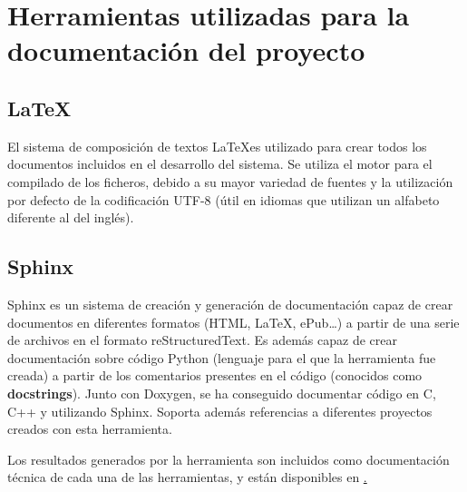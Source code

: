 \section{Herramientas utilizadas para la documentación del proyecto}

\subsection{\LaTeX}

El sistema de composición de textos \LaTeX es utilizado para crear todos los documentos incluidos en el desarrollo del sistema. Se utiliza el motor \XeLaTeX para el compilado de los ficheros, debido a su mayor variedad de fuentes y la utilización por defecto de la codificación UTF-8 (útil en idiomas que utilizan un alfabeto diferente al del inglés).

\subsection{Sphinx}

Sphinx es un sistema de creación y generación de documentación capaz de crear documentos en diferentes formatos (HTML, \LaTeX, ePub\dots) a partir de una serie de archivos en el formato reStructuredText. Es además capaz de crear documentación sobre código Python (lenguaje para el que la herramienta fue creada) a partir de los comentarios presentes en el código (conocidos como \textbf{docstrings}). Junto con Doxygen, se ha conseguido documentar código en C, C++ y %
utilizando Sphinx. Soporta además referencias a diferentes proyectos creados con esta herramienta.

Los resultados generados por la herramienta son incluidos como documentación técnica de cada una de las herramientas, y están disponibles en \href{marcopolo.martinarroyo.net}.



